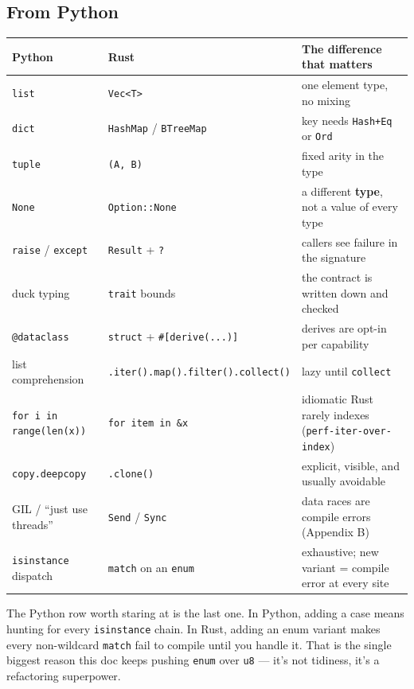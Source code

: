 \documentclass[11pt]{article}
\begin{document}
\subsection{From Python}
\label{sec:orgabc436f}

\begin{center}
\begin{tabular}{lll}
Python & Rust & The difference that matters\\
\hline
\texttt{list} & \texttt{Vec<T>} & one element type, no mixing\\
\texttt{dict} & \texttt{HashMap} / \texttt{BTreeMap} & key needs \texttt{Hash+Eq} or \texttt{Ord}\\
\texttt{tuple} & \texttt{(A, B)} & fixed arity in the type\\
\texttt{None} & \texttt{Option::None} & a different \textbf{type}, not a value of every type\\
\texttt{raise} / \texttt{except} & \texttt{Result} + \texttt{?} & callers see failure in the signature\\
duck typing & \texttt{trait} bounds & the contract is written down and checked\\
\texttt{@dataclass} & \texttt{struct} + \texttt{\#[derive(...)]} & derives are opt-in per capability\\
list comprehension & \texttt{.iter().map().filter().collect()} & lazy until \texttt{collect}\\
\texttt{for i in range(len(x))} & \texttt{for item in \&x} & idiomatic Rust rarely indexes (\texttt{perf-iter-over-index})\\
\texttt{copy.deepcopy} & \texttt{.clone()} & explicit, visible, and usually avoidable\\
GIL / ``just use threads'' & \texttt{Send} / \texttt{Sync} & data races are compile errors (Appendix B)\\
\texttt{isinstance} dispatch & \texttt{match} on an \texttt{enum} & exhaustive; new variant = compile error at every site\\
\end{tabular}
\end{center}

The Python row worth staring at is the last one. In Python, adding a case means
hunting for every \texttt{isinstance} chain. In Rust, adding an enum variant makes
every non-wildcard \texttt{match} fail to compile until you handle it. That is the
single biggest reason this doc keeps pushing \texttt{enum} over \texttt{u8} — it's not
tidiness, it's a refactoring superpower.
\end{document}
